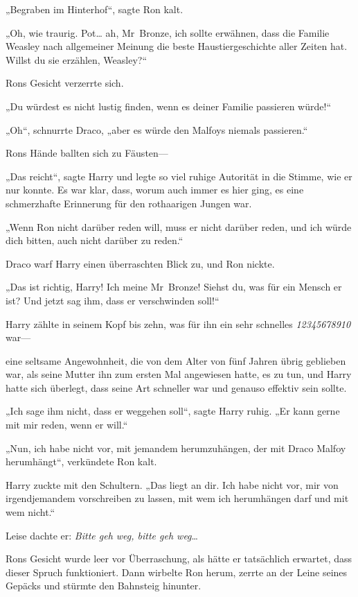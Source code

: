 {„Begraben im Hinterhof“, sagte Ron kalt.

„Oh, wie traurig. Pot… ah, Mr~Bronze, ich sollte erwähnen, dass die Familie Weasley nach allgemeiner Meinung die beste Haustiergeschichte aller Zeiten hat. Willst du sie erzählen, Weasley?“

Rons Gesicht verzerrte sich.

„Du würdest es nicht lustig finden, wenn es deiner Familie passieren würde!“

„Oh“, schnurrte Draco, „aber es würde den Malfoys niemals passieren.“

Rons Hände ballten sich zu Fäusten—

„Das reicht“, sagte Harry und legte so viel ruhige Autorität in die Stimme, wie er nur konnte. Es war klar, dass, worum auch immer es hier ging, es eine schmerzhafte Erinnerung für den rothaarigen Jungen war.

„Wenn Ron nicht darüber reden will, muss er nicht darüber reden, und ich würde dich bitten, auch nicht darüber zu reden.“

Draco warf Harry einen überraschten Blick zu, und Ron nickte.

„Das ist richtig, Harry! Ich meine Mr~Bronze! Siehst du, was für ein Mensch er ist? Und jetzt sag ihm, dass er verschwinden soll!“

Harry zählte in seinem Kopf bis zehn, was für ihn ein sehr schnelles \emph{12345678910} war—

eine seltsame Angewohnheit, die von dem Alter von fünf Jahren übrig geblieben war, als seine Mutter ihn zum ersten Mal angewiesen hatte, es zu tun, und Harry hatte sich überlegt, dass seine Art schneller war und genauso effektiv sein sollte.

„Ich sage ihm nicht, dass er weggehen soll“, sagte Harry ruhig. „Er kann gerne mit mir reden, wenn er will.“

„Nun, ich habe nicht vor, mit jemandem herumzuhängen, der mit Draco Malfoy herumhängt“, verkündete Ron kalt.

Harry zuckte mit den Schultern. „Das liegt an dir. Ich habe nicht vor, mir von irgendjemandem vorschreiben zu lassen, mit wem ich herumhängen darf und mit wem nicht.“

Leise dachte er: \emph{Bitte geh weg, bitte geh weg}…

Rons Gesicht wurde leer vor Überraschung, als hätte er tatsächlich erwartet, dass dieser Spruch funktioniert. Dann wirbelte Ron herum, zerrte an der Leine seines Gepäcks und stürmte den Bahnsteig hinunter.

}
